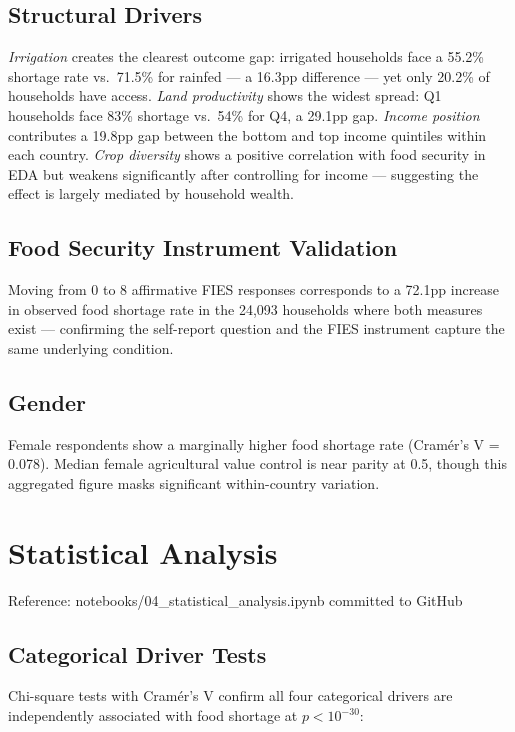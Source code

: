 \documentclass[11pt,a4paper]{article}
\newcommand{\nb}[1]{\vspace{2pt}\begin{refbox}Reference: #1\end{refbox}\vspace{3pt}}
\begin{document}
\subsection{Structural Drivers}

\textit{Irrigation} creates the clearest outcome gap: irrigated households face a 55.2\% shortage rate vs.\ 71.5\% for rainfed — a 16.3pp difference — yet only 20.2\% of households have access. \textit{Land productivity} shows the widest spread: Q1 households face 83\% shortage vs.\ 54\% for Q4, a 29.1pp gap. \textit{Income position} contributes a 19.8pp gap between the bottom and top income quintiles within each country. \textit{Crop diversity} shows a positive correlation with food security in EDA but weakens significantly after controlling for income — suggesting the effect is largely mediated by household wealth.

\subsection{Food Security Instrument Validation}

Moving from 0 to 8 affirmative FIES responses corresponds to a 72.1pp increase in observed food shortage rate in the 24,093 households where both measures exist — confirming the self-report question and the FIES instrument capture the same underlying condition.

\subsection{Gender}

Female respondents show a marginally higher food shortage rate (Cramér's V = 0.078). Median female agricultural value control is near parity at 0.5, though this aggregated figure masks significant within-country variation.

\section{Statistical Analysis}

\nb{notebooks/04\_statistical\_analysis.ipynb committed to GitHub}

\subsection{Categorical Driver Tests}

Chi-square tests with Cramér's V confirm all four categorical drivers are independently associated with food shortage at $p < 10^{-30}$:
\end{document}
